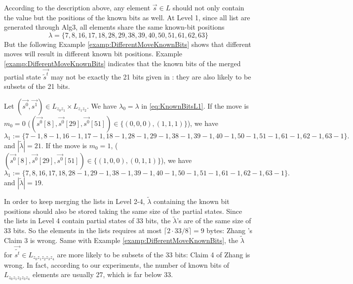 According to the description above, any element $\vec{s}\in L$ should not only contain the value but the  positions of the known bits as well.
At Level 1, since all list are generated through Alg3, all elements share the same known-bit positions
\begin{equation}\label{eq:KnownBitsL1}
\lambda=\{7,8,16,17,18,  28,29,38,39,40,  50,51,61,62,63\}
\end{equation}
But the following Example \ref{examp:DifferentMoveKnownBits} shows that different moves will result in different known bit positions. 
Example \ref{examp:DifferentMoveKnownBits} indicates that the known bits of the merged partial state $\vec{\tilde{s}^t}$ may not be exactly the 21 bits given in \cite{AC:Zhang19}: they are also likely to be subsets of the 21 bits.
\begin{example}\label{examp:DifferentMoveKnownBits}
  Let $(\vec{s^0},\vec{s^1})\in L_{z_0z_1}\times L_{z_1z_2}$.
  We have $\lambda_0=\lambda$ in \eqref{eq:KnownBitsL1}.
  If the move is $m_0=0$ ($(\vec{s^0}[8], \vec{s^0}[29], \vec{s^0}[51])\in \{(0,0,0),(1,1,1)\}$), we have
  \[
  \lambda_1:=\{7-1,8-1,16-1,17-1,18-1,   28-1,29-1,38-1,39-1,40-1,  50-1,51-1,61-1,62-1,63-1  \}.
  \]
  and $|\tilde{\lambda}|=21$. 
  If the move is $m_0=1$, ($(\vec{s^0}[8], \vec{s^0}[29], \vec{s^0}[51])\in \{(1,0,0),(0,1,1)\}$), we have
  \[
  \lambda_1:=\{7,8,16,17,18,   28-1,29-1,38-1,39-1,40-1,  50-1,51-1,61-1,62-1,63-1  \}.
  \]
    and $|\tilde{\lambda}|=19$.
\end{example}
In order to keep merging the lists in Level 2-4, $\tilde{\lambda}$ containing the known bit positions should also be stored taking the same size of the partial states.
Since the lists in Level 4 contain partial states of 33 bits, the $\tilde{\lambda}$'s are of the same size of 33 bits.
So the elements in the lists requires at most $\lceil 2\cdot 33/8\rceil=9$ bytes: Zhang \etal's Claim 3 is wrong.
Same with Example \ref{examp:DifferentMoveKnownBits}, the $\tilde{\lambda}$ for $\vec{\tilde{s^t}}\in L_{z_0z_1z_2z_3z_4}$ are more likely to be subsets of the 33 bits: Claim 4 of Zhang \etal is wrong.
In fact, according to our experiments, the number of known bits of $L_{z_0z_1z_2z_3z_4}$ elements are usually 27, which is far below 33.

